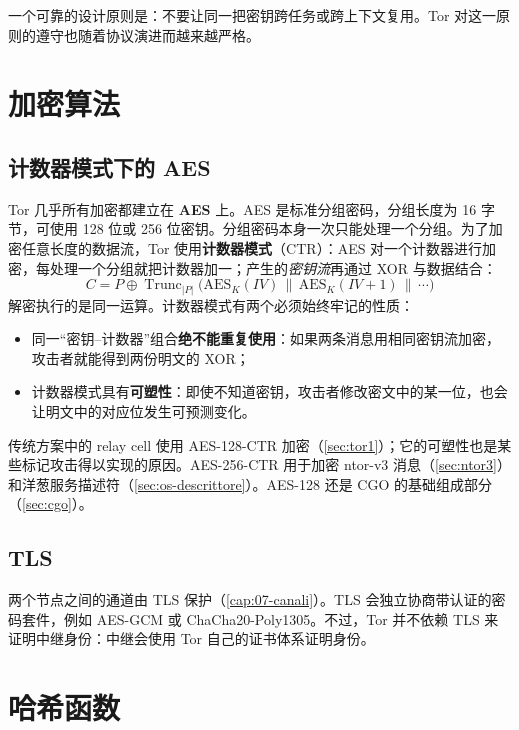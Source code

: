 一个可靠的设计原则是：不要让同一把密钥跨任务或跨上下文复用。Tor 对这一原则的遵守也随着协议演进而越来越严格。

\section{加密算法}\label{sec:cripto-cifrari}

\subsection{计数器模式下的 AES}

Tor 几乎所有加密都建立在 \textbf{AES} 上。AES 是标准分组密码，分组长度为 16 字节，可使用 128 位或 256 位密钥。分组密码本身一次只能处理一个分组。为了加密任意长度的数据流，Tor 使用\textbf{计数器模式}（CTR）：AES 对一个计数器进行加密，每处理一个分组就把计数器加一；产生的\emph{密钥流}再通过 XOR 与数据结合：
\[
C = P \oplus \operatorname{Trunc}_{|P|}\bigl(\mathrm{AES}_K(\mathit{IV}) \,\|\, \mathrm{AES}_K(\mathit{IV}+1) \,\|\, \cdots\bigr)
\]
解密执行的是同一运算。计数器模式有两个必须始终牢记的性质：
\begin{itemize}
  \item 同一“密钥--计数器”组合\textbf{绝不能重复使用}：如果两条消息用相同密钥流加密，攻击者就能得到两份明文的 XOR；
  \item 计数器模式具有\textbf{可塑性}：即使不知道密钥，攻击者修改密文中的某一位，也会让明文中的对应位发生可预测变化。
\end{itemize}
传统方案中的 relay cell 使用 AES-128-CTR 加密（\cref{sec:tor1}）；它的可塑性也是某些标记攻击得以实现的原因。AES-256-CTR 用于加密 ntor-v3 消息（\cref{sec:ntor3}）和洋葱服务描述符（\cref{sec:os-descrittore}）。AES-128 还是 CGO 的基础组成部分（\cref{sec:cgo}）。

\subsection{TLS}

两个节点之间的通道由 TLS 保护（\cref{cap:07-canali}）。TLS 会独立协商带认证的密码套件，例如 AES-GCM 或 ChaCha20-Poly1305。不过，Tor 并不依赖 TLS 来证明中继身份：中继会使用 Tor 自己的证书体系证明身份。

\section{哈希函数}\label{sec:cripto-hash}

